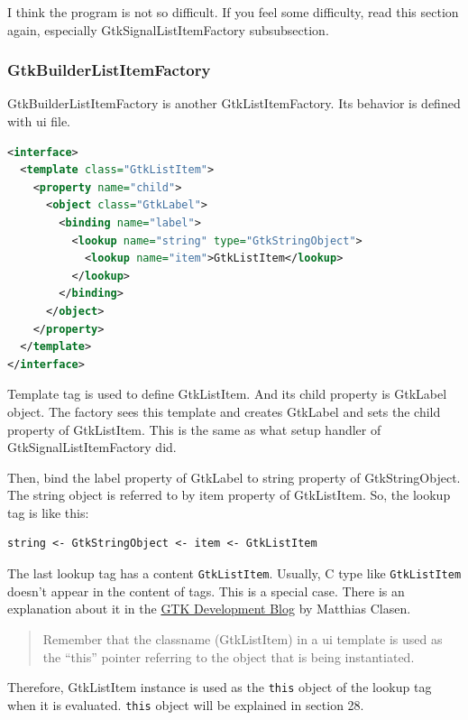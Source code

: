 I think the program is not so difficult. If you feel some difficulty,
read this section again, especially GtkSignalListItemFactory
subsubsection.

\hypertarget{gtkbuilderlistitemfactory}{%
\subsubsection{GtkBuilderListItemFactory}\label{gtkbuilderlistitemfactory}}

GtkBuilderListItemFactory is another GtkListItemFactory. Its behavior is
defined with ui file.

\begin{lstlisting}[language=XML]
<interface>
  <template class="GtkListItem">
    <property name="child">
      <object class="GtkLabel">
        <binding name="label">
          <lookup name="string" type="GtkStringObject">
            <lookup name="item">GtkListItem</lookup>
          </lookup>
        </binding>
      </object>
    </property>
  </template>
</interface>
\end{lstlisting}

Template tag is used to define GtkListItem. And its child property is
GtkLabel object. The factory sees this template and creates GtkLabel and
sets the child property of GtkListItem. This is the same as what setup
handler of GtkSignalListItemFactory did.

Then, bind the label property of GtkLabel to string property of
GtkStringObject. The string object is referred to by item property of
GtkListItem. So, the lookup tag is like this:

\begin{lstlisting}
string <- GtkStringObject <- item <- GtkListItem
\end{lstlisting}

The last lookup tag has a content \passthrough{\lstinline!GtkListItem!}.
Usually, C type like \passthrough{\lstinline!GtkListItem!} doesn't
appear in the content of tags. This is a special case. There is an
explanation about it in the
\href{https://blog.gtk.org/2020/09/05/a-primer-on-gtklistview/}{GTK
Development Blog} by Matthias Clasen.

\begin{quote}
Remember that the classname (GtkListItem) in a ui template is used as
the ``this'' pointer referring to the object that is being instantiated.
\end{quote}

Therefore, GtkListItem instance is used as the
\passthrough{\lstinline!this!} object of the lookup tag when it is
evaluated. \passthrough{\lstinline!this!} object will be explained in
section 28.


